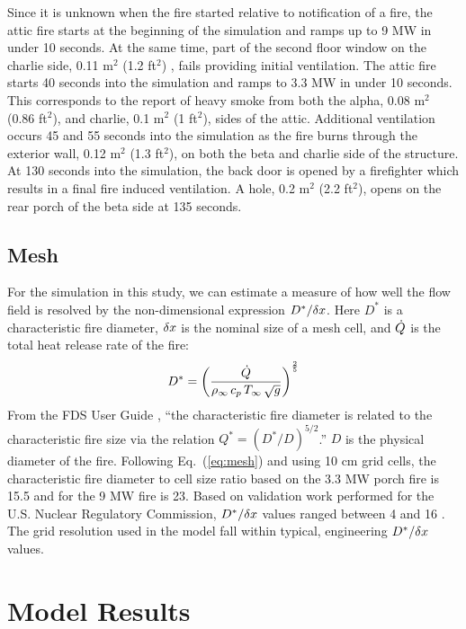 \documentclass[11pt,oneside]{book}
\begin{document}
Since it is unknown when the fire started relative to notification of a fire, the attic fire starts at the beginning of the simulation and ramps up to 9 MW in under 10 seconds. At the same time, part of the second floor window on the charlie side, 0.11 m$^2$ (1.2 ft$^2$) , fails providing initial ventilation.  The attic fire starts 40 seconds into the simulation and ramps to 3.3 MW in under 10 seconds. This corresponds to the report of heavy smoke from both the alpha, 0.08 m$^2$ (0.86 ft$^2$), and charlie, 0.1 m$^2$ (1 ft$^2$), sides of the attic. Additional ventilation occurs 45 and 55 seconds into the simulation as the fire burns through the exterior wall, 0.12 m$^2$ (1.3 ft$^2$), on both the beta and charlie side of the structure. At 130 seconds into the simulation, the back door is opened by a firefighter which results in a final fire induced ventilation. A hole, 0.2 m$^2$ (2.2 ft$^2$),  opens on the rear porch of the beta side at 135 seconds.

\section{Mesh}
\label{mesh}

For the simulation in this study, we can estimate a measure of how well the flow field is resolved by the non-dimensional expression $D^*/\delta x$. Here $D^*$ is a characteristic fire diameter, $\delta x$ is the nominal size of a mesh cell, and $\dot{Q}$ is the total heat release rate of the fire:
\begin{equation}
D^* = \left(
     \frac{\dot{Q}}{\rho_\infty \, c_p \, T_\infty \, \sqrt{g} }
     \right)^\frac{2}{5} 
\label{eq:mesh}
\end{equation}   
From the FDS User Guide \cite{FDS_Users_Guide}, ``the characteristic fire diameter is related to the characteristic fire size via the
relation $Q^* = (D^*/D)^{5/2}$.'' $D$ is the physical diameter of the fire. Following Eq.~(\ref{eq:mesh}) and using 10 cm grid cells, the characteristic fire diameter to cell size ratio based on the 3.3 MW porch fire is 15.5 and for the 9 MW fire is 23. Based on validation work performed for the U.S. Nuclear Regulatory Commission, $D^*/\delta x$ values ranged between 4 and 16 \cite{NUREG_1824}. The grid resolution used in the model fall within typical, engineering $D^*/\delta x$ values.

\chapter{Model Results}
\end{document}
